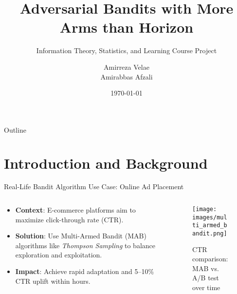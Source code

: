 \documentclass{beamer}
\title{Adversarial Bandits with More Arms than Horizon}
\subtitle{Information Theory, Statistics, and Learning Course Project}
\author{Amirreza Velae \\ Amirabbas Afzali}
\institute{Sharif University of Technology}
\date{\today}
\begin{document}
\begin{frame}
    \titlepage
\end{frame}

\begin{frame}{Outline}
    \tableofcontents
\end{frame}
\section{Introduction and Background}

\begin{frame}{Real-Life Bandit Algorithm Use Case: Online Ad Placement}
  \begin{columns}
    \begin{column}{0.6\textwidth}
      \begin{itemize}
        \item \textbf{Context}: E-commerce platforms aim to maximize click-through rate (CTR).
        \item \textbf{Solution}: Use Multi-Armed Bandit (MAB) algorithms like \textit{Thompson Sampling} to balance exploration and exploitation.
        \item \textbf{Impact}: Achieve rapid adaptation and 5–10\% CTR uplift within hours.
      \end{itemize}
    \end{column}
    \begin{column}{0.4\textwidth}
      \begin{figure}
        \centering
        \texttt{[image: images/multi\_armed\_bandit.png]}
        \caption{CTR comparison: MAB vs. A/B test over time}
      \end{figure}
    \end{column}
  \end{columns}
\end{frame}
\end{document}
